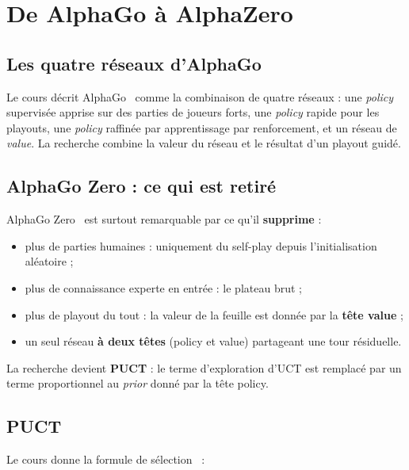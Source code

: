 \documentclass[11pt,a4paper]{article}
\begin{document}
\section{De AlphaGo à AlphaZero}\label{de-alphago-uxe0-alphazero}

\subsection{Les quatre réseaux d'AlphaGo}\label{les-quatre-ruxe9seaux-dalphago}

Le cours décrit AlphaGo~\cite{silver2016} comme la combinaison de quatre réseaux : une
\emph{policy} supervisée apprise sur des parties de joueurs forts, une \emph{policy} rapide
pour les playouts, une \emph{policy} raffinée par apprentissage par renforcement, et
un réseau de \emph{value}. La recherche combine la valeur du réseau et le résultat
d'un playout guidé.

\subsection{AlphaGo Zero : ce qui est retiré}\label{alphago-zero-ce-qui-est-retiruxe9}

AlphaGo Zero~\cite{silver2017} est surtout remarquable par ce qu'il \textbf{supprime} :

\begin{itemize}
\setlength{\itemsep}{1pt}\setlength{\parskip}{0pt}
\item
  plus de parties humaines : uniquement du self-play depuis l'initialisation
  aléatoire ;
\item
  plus de connaissance experte en entrée : le plateau brut ;
\item
  plus de playout du tout : la valeur de la feuille est donnée par la \textbf{tête
  value} ;
\item
  un seul réseau \textbf{à deux têtes} (policy et value) partageant une tour
  résiduelle.
\end{itemize}

La recherche devient \textbf{PUCT} : le terme d'exploration d'UCT est remplacé par un
terme proportionnel au \emph{prior} donné par la tête policy.

\subsection{PUCT}\label{puct}

Le cours donne la formule de sélection~\cite{rosin2011puct} :
\end{document}

